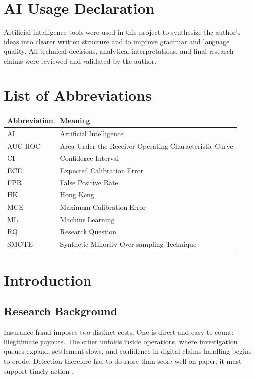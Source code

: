 \documentclass[12pt,a4paper]{report}
\begin{document}
\chapter*{AI Usage Declaration}
Artificial intelligence tools were used in this project to synthesize the author's ideas into clearer written structure and to improve grammar and language quality. All technical decisions, analytical interpretations, and final research claims were reviewed and validated by the author.

\tableofcontents
\listoffigures
\listoftables

\chapter*{List of Abbreviations}
\begin{longtable}{p{}p{}}
\toprule
\textbf{Abbreviation} & \textbf{Meaning} \\
\midrule
\endhead
AI & Artificial Intelligence \\
AUC-ROC & Area Under the Receiver Operating Characteristic Curve \\
CI & Confidence Interval \\
ECE & Expected Calibration Error \\
FPR & False Positive Rate \\
HK & Hong Kong \\
MCE & Maximum Calibration Error \\
ML & Machine Learning \\
RQ & Research Question \\
SMOTE & Synthetic Minority Over-sampling Technique \\
\bottomrule
\end{longtable}


\chapter{Introduction}

\section{Research Background}
Insurance fraud imposes two distinct costs. One is direct and easy to count: illegitimate payouts. The other unfolds inside operations, where investigation queues expand, settlement slows, and confidence in digital claims handling begins to erode. Detection therefore has to do more than score well on paper; it must support timely action \citep{bolton2002,phua2010}.
\end{document}
